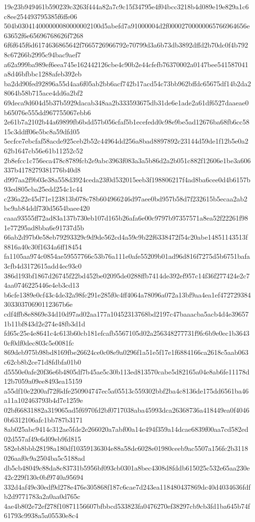 {19e23b949461b590239c3263f444a82a7c9c15f34795e4f04bcc3218b4d089e19e829a1c6c8ee254493795385f6ffe06
504b030414000000080000002100d5abefd7a91000004d2f00002700000065766964656e63652f6e65696768626f7268
6f6f645f6d6174636865642f7665726966792e70799d3a6b73db3892dffd2b70dc0f4b7928c67266b2995c94bac9aef7
a62a999ba989ef6eea745e162442126cbe4c90b2e44cfefb76370002a0147bee541587041a8d46bfbbc1288afeb392eb
ba2dd90fed92896a55d4aa6f05ab2bb6acf742b17acd54c73bb962bffdc65675df14b2da28064b58b715ace4dd6a2bf2
69deca9d604d5b37b5929dacab348aa2b333593675db31de6e1ade2a61df6527daaeae0b65076e555dd967755067ebb6
2e61b7a2102b44a69899fb6bdd57b056cfaf5b1ecefedd0c98e9be5ad12676ba68fb6cc5815c3ddff06e5bc8a59dfd05
5ecfce7ebcfaf58acde925ceb2b52c44964dd256a8bad8897892c23144d59de1f12b5e0a262b1647cb56e61b11252c52
2b8efcc1c756eca478c8789fcb2e9abc3963f083a3a5b86d2a2b051c882f12606e1be3a606337b4178279381776b40d8
d997aa2f9b03e38a558d3924ceda23f0d532015eeb3f198806217f4ad8ba6cee0d4b6157b93ed805cba25edd254c1c44
c236a22e45d71e123813b078c78b604966246d97aee0bd957b58d7f232615b5ecaa2ab2bc9ab84ddf730d5654baee420
caaa93555ff72ad83a137b730eb107d165b26afa6e00c9797b97357571a8ea52f22261f981e77295ad8bba6e91737d5b
66ab2d97b0e58eb79293329c9d9de562cd4a59c9b22f6338472f54c20abe14851143513f8816a40c30f1634a6ff18454
fa1105aa974c0854ae59557766c53b76a111e0afe55209b01ad96d816f7275d5b6751bafa3cfb4d3172615add4ec93c0
386d193bf1867d26745f22bd452be02095de0288ffb7414de392ef957c14f36f277424e2c74aa0746225446e4eb3cd13
b6cfe1389e0cf43c4de32a98fc291e285f0c4ff4064a78096a072a13bf9aa4ea1ef47272938430330370690112367b6e
cdf4ffb8e8869e34d10d97ad02aa177a10452313768bd2197c47baaacba5acb4d4e396571b11bf843d2e274e48fb3d1d
fd65c25e4e8641c4c613b60cb181efcafb5567105d02a256348277731f9fc6b9e0ec1b36430cf0df0dec803c5e0081fc
869deb975b98bd8169fbe26624ce0c08e9a0296f1a51e5f17e1f6884166ca2618c5aab063c62cb8b2ce71d8fdbfa01b0
d5550e0afe20f36e6b4805df7b45ae5c30b113ed813570cabe5d82165a04e8ab6fe11178d12b7059a09ee8493ea15159
a55df10e2200af72f6dfe250904747ec5a05513c559302bbf2ba4c8136de175dd6561ba46a11a102463793b4d7e1259e
02bf66831882a319065ad5f6970fd2bf0717038aba45993dca26368736a418449ea0f40460b6312106afc1bb787b3171
8ab025abc9414c312ae5fde2e266020a7abf00a14e494f359a14dcae6839f00aa7cd582ed02d557af49c6d09eb9fd815
582eb8bbb28198a180df10359136304e88a58dc6028e01980ceeb9ac5507a156fc2b3118026aaf0c9a2504ba5c5188ad
db5cb48049c88da8c83731b5956bf093cb0301a8bec4308d8fddb615025c532e65aa230e42c229f130c0bf9740a95694
332d4af49e30edf9d278e476e305868f187c6cae7d243ea118480437869dc40d4034636fdfb2d9771783a2a0aa0d765c
4ae4b802e72ef278f10871156607bfbbcd533823fa0476270ef38297cb9cb3fd1ba645b74f61793c9938a5a05530e8c4
}
